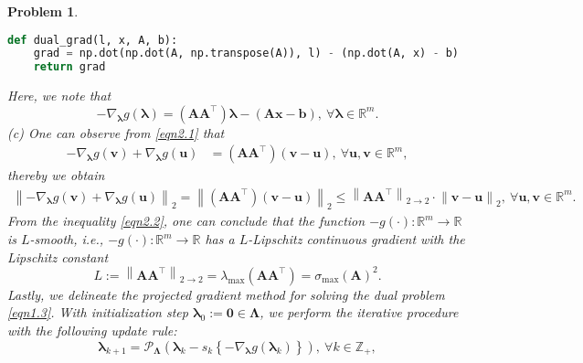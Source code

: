 \documentclass[11pt]{article}
\newtheorem{problem}{Problem}
\begin{document}
\begin{problem}
{\begin{lstlisting}[language = Python]
def dual_grad(l, x, A, b):
    grad = np.dot(np.dot(A, np.transpose(A)), l) - (np.dot(A, x) - b)
    return grad
\end{lstlisting}
Here, we note that
\begin{equation}
    \label{eqn2.1}
    - \nabla_{\bm{\lambda}} g (\bm{\lambda}) = \left( \mathbf{A} \mathbf{A}^{\top} \right) \bm{\lambda} - \left( \mathbf{A x} - \mathbf{b} \right),\ \forall \bm{\lambda} \in \mathbb{R}^m.
\end{equation}
\indent (c) One can observe from \eqref{eqn2.1} that
\begin{equation*}
    \begin{split}
        - \nabla_{\bm{\lambda}} g ( \mathbf{v} ) + \nabla_{\bm{\lambda}} g ( \mathbf{u} )
        &= \left( \mathbf{AA}^{\top} \right) \left( \mathbf{v} - \mathbf{u} \right),\ \forall \mathbf{u}, \mathbf{v} \in \mathbb{R}^m,
    \end{split}
\end{equation*}
thereby we obtain
\begin{equation}
    \label{eqn2.2}
    \begin{split}
        \left\| - \nabla_{\bm{\lambda}} g ( \mathbf{v} ) + \nabla_{\bm{\lambda}} g ( \mathbf{u} ) \right\|_{2}
        = \left\| \left( \mathbf{AA}^{\top} \right) \left( \mathbf{v} - \mathbf{u} \right) \right\|_{2}
        \leq \left\| \mathbf{AA}^{\top} \right\|_{2 \to 2} \cdot \left\| \mathbf{v} - \mathbf{u} \right\|_2,\ \forall \mathbf{u}, \mathbf{v} \in \mathbb{R}^m.
    \end{split}
\end{equation}
From the inequality \eqref{eqn2.2}, one can conclude that the function $-g (\cdot) : \mathbb{R}^m \rightarrow \mathbb{R}$ is $L$-smooth, \emph{i.e.}, $-g (\cdot) : \mathbb{R}^m \rightarrow \mathbb{R}$ has a $L$-Lipschitz continuous gradient with the Lipschitz constant
\begin{equation*}
    L := \left\| \mathbf{A} \mathbf{A}^{\top} \right\|_{2 \to 2} = \lambda_{\max} \left( \mathbf{A} \mathbf{A}^{\top} \right) = \sigma_{\max} (\mathbf{A})^2.
\end{equation*}
\indent Lastly, we delineate the projected gradient method for solving the dual problem \eqref{eqn1.3}. With initialization step $\bm{\lambda}_0 := \mathbf{0} \in \bm{\Lambda}$, we perform the iterative procedure with the following update rule:
\begin{equation}
    \label{eqn2.3}
    \bm{\lambda}_{k+1} = \mathcal{P}_{\bm{\Lambda}} \left( \bm{\lambda}_k - s_k \left\{ - \nabla_{\bm{\lambda}} g \left( \bm{\lambda}_k \right) \right\} \right),\ \forall k \in \mathbb{Z}_{+},

\end{equation}}
\end{problem}
\end{document}
